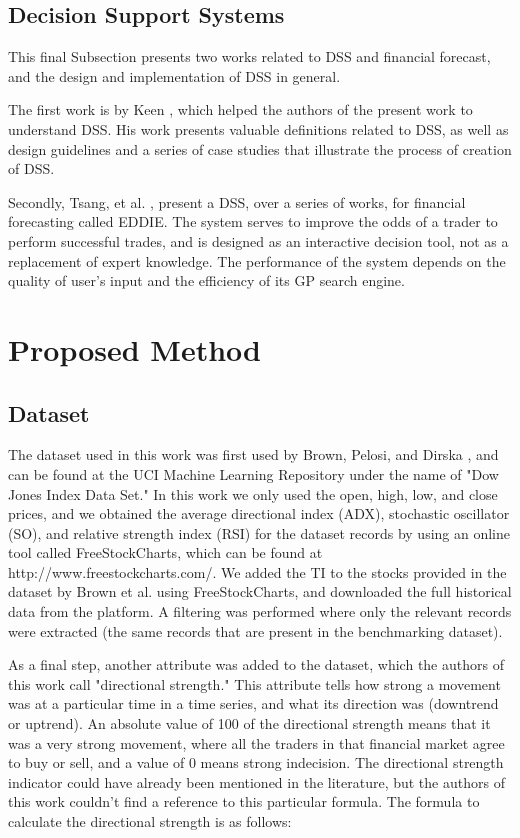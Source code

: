 \documentclass[12pt,journal,compsoc]{IEEEtran}
\begin{document}
\subsection{Decision Support Systems}
\label{decision-support-systems}

This final Subsection presents two works related to DSS and financial forecast, and the design and implementation of DSS in general.

The first work is by Keen \cite{keen1980decision}, which helped the authors of the present work to understand DSS. His work presents valuable definitions related to DSS, as well as design guidelines and a series of case studies that illustrate the process of creation of DSS.

Secondly, Tsang, et al. \cite{tsang1998eddie} \cite{tsang2000eddie} \cite{Tsang2004}  \cite{Tsang2008}, present a DSS, over a series of works, for financial forecasting called EDDIE. The system serves to improve the odds of a trader to perform successful trades, and is designed as an interactive decision tool, not as a replacement of expert knowledge. The performance of the system depends on the quality of user's input and the efficiency of its GP search engine.

\section{Proposed Method}
\label{proposed-method}

\subsection{Dataset}
\label{dataset}

The dataset used in this work was first used by Brown, Pelosi, and Dirska \cite{brown2013dynamic}, and can be found at the UCI Machine Learning Repository under the name of "Dow Jones Index Data Set." In this work we only used the open, high, low, and close prices, and we obtained the average directional index (ADX), stochastic oscillator (SO), and relative strength index (RSI) for the dataset records by using an online tool called FreeStockCharts, which can be found at http://www.freestockcharts.com/. We added the TI to the stocks provided in the dataset by Brown et al. using FreeStockCharts, and downloaded the full historical data from the platform. A filtering was performed where only the relevant records were extracted (the same records that are present in the benchmarking dataset).

As a final step, another attribute was added to the dataset, which the authors of this work call "directional strength." This attribute tells how strong a movement was at a particular time in a time series, and what its direction was (downtrend or uptrend). An absolute value of 100 of the directional strength means that it was a very strong movement, where all the traders in that financial market agree to buy or sell, and a value of 0 means strong indecision. The directional strength indicator could have already been mentioned in the literature, but the authors of this work couldn't find a reference to this particular formula. The formula to calculate the directional strength is as follows:
\end{document}
